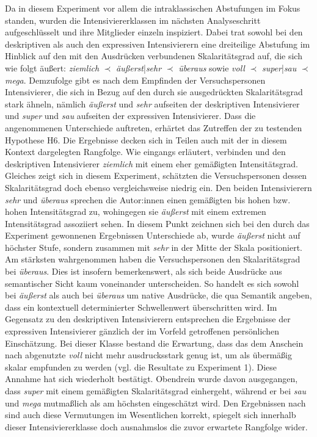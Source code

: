 Da in diesem Experiment vor allem die intraklassischen Abstufungen im Fokus standen, wurden die Intensiviererklassen im nächsten Analyseschritt aufgeschlüsselt und ihre Mitglieder einzeln inspiziert. Dabei trat sowohl bei den deskriptiven als auch den expressiven Intensivierern eine dreiteilige Abstufung im Hinblick auf den mit den Ausdrücken verbundenen Skalaritätsgrad auf, die sich wie folgt äußert: \textit{ziemlich} $\prec$ \textit{äußerst}|\textit{sehr} $\prec$ \textit{überaus} sowie {\textit{voll} $\prec$ \textit{super}|\textit{sau} $\prec$ \textit{mega}}. Demzufolge gibt es nach dem Empfinden der Versuchspersonen Intensivierer, die sich in Bezug auf den durch sie ausgedrückten Skalaritätsgrad stark ähneln, nämlich \textit{äußerst} und \textit{sehr} aufseiten der deskriptiven Intensivierer und \textit{super} und \textit{sau} aufseiten der expressiven Intensivierer. Dass die angenommenen Unterschiede auftreten, erhärtet das Zutreffen der zu testenden Hypothese H6. Die Ergebnisse decken sich in Teilen auch mit der in diesem Kontext dargelegten Rangfolge. Wie eingangs erläutert, verbinden {\citet[87]{Biedermann.1969}} und {\citet[408]{Breindl.2007}} den deskriptiven Intensivierer \textit{ziemlich} mit einem eher gemäßigten Intensitätsgrad. Gleiches zeigt sich in diesem Experiment, schätzten  die Versuchspersonen dessen Skalaritätsgrad doch ebenso vergleichsweise niedrig ein. Den beiden Intensivierern \textit{sehr} und \textit{überaus} sprechen die Autor:innen einen gemäßigten bis hohen bzw. hohen Intensitätsgrad zu, wohingegen sie \textit{äußerst} mit einem extremen Intensitätsgrad assoziiert sehen. In diesem Punkt zeichnen sich bei den durch das Experiment gewonnenen Ergebnissen Unterschiede ab, wurde \textit{äußerst} nicht auf höchster Stufe, sondern zusammen mit \textit{sehr} in der Mitte der Skala positioniert. Am stärksten wahrgenommen haben die Versuchspersonen den Skalaritätsgrad bei \textit{überaus}. Dies ist insofern bemerkenswert, als sich beide Ausdrücke aus semantischer Sicht kaum voneinander unterscheiden. So handelt es sich sowohl bei \textit{äußerst} als auch bei \textit{überaus} um native Ausdrücke, die qua Semantik angeben, dass ein kontextuell determinierter Schwellenwert überschritten wird. Im Gegensatz zu den deskriptiven Intensivierern entsprechen die Ergebnisse der expressiven Intensivierer gänzlich der im Vorfeld getroffenen persönlichen Einschätzung. Bei dieser Klasse bestand die Erwartung, dass das dem Anschein nach abgenutzte \textit{voll} nicht mehr ausdrucksstark genug ist, um als übermäßig skalar empfunden zu werden (vgl. die Resultate zu {Experiment 1}). Diese Annahme hat sich wiederholt bestätigt. Obendrein wurde davon ausgegangen, dass \textit{super} mit einem gemäßigten Skalaritätsgrad einhergeht, während er bei \textit{sau} und \textit{mega} mutmaßlich als am höchsten eingeschätzt wird. Den Ergebnissen nach sind auch diese Vermutungen im Wesentlichen korrekt, spiegelt sich innerhalb dieser Intensiviererklasse doch ausnahmslos die zuvor erwartete Rangfolge wider.


